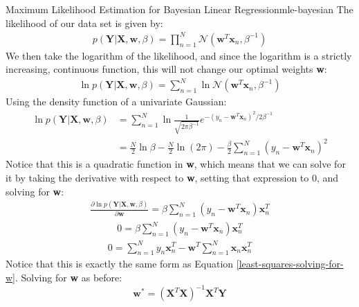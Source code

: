 \begin{derivation}{Maximum Likelihood Estimation for Bayesian Linear Regression}{mle-bayesian}
    The likelihood of our data set is given by:
    \begin{align*}
        p(\textbf{Y} | \textbf{X}, \textbf{w}, \beta) = \prod_{n=1}^{N} \mathcal{N}(\textbf{w}^{T}\textbf{x}_{n}, \beta^{-1})
    \end{align*}
    We then take the logarithm of the likelihood, and since the logarithm is a strictly increasing, continuous function, this will not change our optimal weights \textbf{w}:
    \begin{align*}
        \ln{p(\textbf{Y} | \textbf{X}, \textbf{w}, \beta)} = \sum_{n=1}^{N} \ln{\mathcal{N}(\textbf{w}^{T}\textbf{x}_{n}, \beta^{-1})}
    \end{align*}
    Using the density function of a univariate Gaussian:
    \begin{align*}
        \ln{p(\textbf{Y} | \textbf{X}, \textbf{w}, \beta)} &= \sum_{n=1}^{N} \ln{\frac{1}{\sqrt{2\pi\beta^{-1}}} e^{-(y_{n} - \textbf{w}^{T}\textbf{x}_{n})^2 / 2\beta^{-1}}} \\
        &= \frac{N}{2}\ln{\beta} - \frac{N}{2}\ln{(2\pi)} - \frac{\beta}{2} \sum_{n=1}^{N} (y_{n} - \textbf{w}^{T}\textbf{x}_{n})^2
    \end{align*}
    Notice that this is a quadratic function in \textbf{w}, which means that we can solve for it by taking the derivative with respect to \textbf{w}, setting that expression to 0, and solving for \textbf{w}:
    \begin{align*}
        \frac{\partial \ln{p(\textbf{Y} | \textbf{X}, \textbf{w}, \beta)}}{\partial \textbf{w}} = \beta \sum_{n=1}^{N} (y_{n} - \textbf{w}^{T}\textbf{x}_{n})\textbf{x}_{n}^{T}
    \end{align*}
    \begin{align*}
        0 = \beta \sum_{n=1}^{N} (y_{n} - \textbf{w}^{T}\textbf{x}_{n})\textbf{x}_{n}^{T}
    \end{align*}
    \begin{align*}
        0 = \sum_{n=1}^{N} y_{n}\textbf{x}_{n}^{T} - \textbf{w}^{T} \sum_{n=1}^{N} \textbf{x}_{n}\textbf{x}_{n}^{T}
    \end{align*}
    Notice that this is exactly the same form as Equation \ref{least-squares-solving-for-w}. Solving for \textbf{w} as before:
    \begin{equation} \label{bayesian-solved-for-w}
        \textbf{w}^{*} = (\textbf{X}^{T}\textbf{X})^{-1}\textbf{X}^{T}\textbf{Y}
    \end{equation}
\end{derivation}

